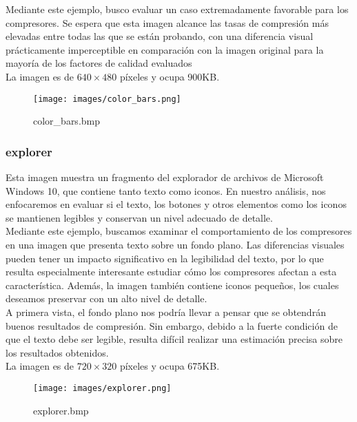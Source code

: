 \documentclass[12pt,a4paper]{article}
\begin{document}
Mediante este ejemplo, busco evaluar un caso extremadamente favorable para los compresores. Se espera que esta imagen alcance las tasas de compresión más elevadas entre todas las que se están probando, con una diferencia visual prácticamente imperceptible en comparación con la imagen original para la mayoría de los factores de calidad evaluados\\  

La imagen es de $640\times480$ píxeles y ocupa 900KB.\\
 
\begin{figure}[H]
    \centering
    \texttt{[image: images/color\_bars.png]}
    \caption{color\_bars.bmp}
    
\end{figure}

\break
\subsubsection{explorer}
Esta imagen muestra un fragmento del explorador de archivos de Microsoft Windows 10, que contiene tanto texto como iconos. En nuestro análisis, nos enfocaremos en evaluar si el texto, los botones y otros elementos como los iconos se mantienen legibles y conservan un nivel adecuado de detalle.\\

Mediante este ejemplo, buscamos examinar el comportamiento de los compresores en una imagen que presenta texto sobre un fondo plano. Las diferencias visuales pueden tener un impacto significativo en la legibilidad del texto, por lo que resulta especialmente interesante estudiar cómo los compresores afectan a esta característica. Además, la imagen también contiene iconos pequeños, los cuales deseamos preservar con un alto nivel de detalle.\\

A primera vista, el fondo plano nos podría llevar a pensar que se obtendrán buenos resultados de compresión. Sin embargo, debido a la fuerte condición de que el texto debe ser legible, resulta difícil realizar una estimación precisa sobre los resultados obtenidos.\\

La imagen es de $720\times320$ píxeles y ocupa 675KB.\\

\begin{figure}[H]
    \centering
    \texttt{[image: images/explorer.png]}
    \caption{explorer.bmp}
    
\end{figure}
\end{document}
